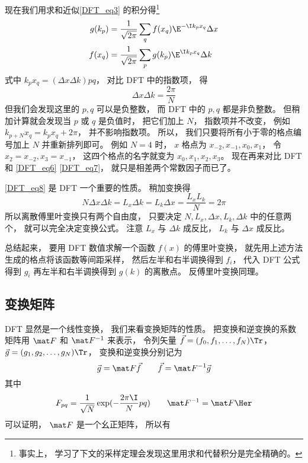 现在我们用求和近似\autoref{DFT_eq3} 的积分得\footnote{事实上， 学习了下文的采样定理会发现这里用求和代替积分是完全精确的。}
\begin{align}
g(k_p) &= \frac{1}{\sqrt{2\pi}} \sum_q f(x_q) \E^{-\I k_p x_q} \Delta x\label{DFT_eq6}\\
f(x_q) &= \frac{1}{\sqrt{2\pi}} \sum_p g(k_p) \E^{\I k_p x_q} \Delta k\label{DFT_eq7}
\end{align}
式中 $k_p x_q = (\Delta x \Delta k)pq$， 对比 DFT 中的指数项， 得
\begin{equation}\label{DFT_eq8}
\Delta x\Delta k = \frac{2\pi}{N}
\end{equation}
但我们会发现这里的 $p, q$ 可以是负整数， 而 DFT 中的 $p, q$ 都是非负整数。 但稍加计算就会发现当 $p$ 或 $q$ 是负值时， 把它们加上 $N$， 指数项并不改变， 例如 $k_{p+N} x_q = k_p x_q + 2\pi$， 并不影响指数项。 所以， 我们只要将所有小于零的格点编号加上 $N$ 并重新排列即可。 例如 $N = 4$ 时， $x$ 格点为 $x_{-2}, x_{-1}, x_0, x_1$， 令 $x_2 = x_{-2}, x_3 = x_{-1}$， 这四个格点的名字就变为 $x_0, x_1, x_2, x_3$。 现在再来对比 DFT 和 \autoref{DFT_eq6} \autoref{DFT_eq7}， 就只是相差两个常数因子而已了。

\autoref{DFT_eq8} 是 DFT 一个重要的性质。 稍加变换得
\begin{equation}
N\Delta x \Delta k = L_x \Delta k = L_k \Delta x = \frac{L_x L_k}{N} = 2\pi
\end{equation}
所以离散傅里叶变换只有两个自由度， 只要决定 $N, L_x, \Delta x, L_k, \Delta k$ 中的任意两个， 就可以完全决定变换公式。 注意 $L_x$ 与 $\Delta k$ 成反比， $L_k$ 与 $\Delta x$ 成反比。

总结起来， 要用 DFT 数值求解一个函数 $f(x)$ 的傅里叶变换， 就先用上述方法生成的格点将该函数等间距采样， 然后左半和右半调换得到 $f_i$， 代入 DFT 公式得到 $g_i$ 再左半和右半调换得到 $g(k)$ 的离散点。 反傅里叶变换同理。

\subsection{变换矩阵}
DFT 显然是一个线性变换， 我们来看变换矩阵的性质。 把变换和逆变换的系数矩阵用%
 $\mat F$ 和 $\mat F^{-1}$ 来表示， 令列矢量 $\vec f = (f_0,f_1,\dots,f_N)\Tr$， $\vec g = (g_1,g_2,\dots,g_N)\Tr$， 变换和逆变换分别记为
\begin{equation}
\vec g = \mat F \vec f \qquad
\vec f = \mat F^{-1} \vec g
\end{equation}
其中
\begin{equation}
F_{pq} = \frac{1}{\sqrt{N}} \exp(-\frac{2\pi\I}{N} p q) \qquad
\mat F^{-1} = \mat F\Her
\end{equation}
可以证明， $\mat F$ 是一个幺正矩阵， 所以有

